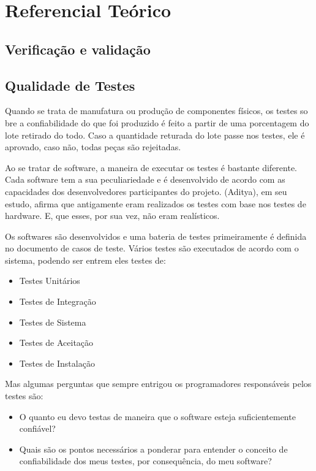 \chapter[Referencial]{Referencial Teórico}

\section{Verificação e validação}
\section{Qualidade de Testes}
Quando se trata de manufatura ou produção de componentes físicos, os testes so
bre a confiabilidade do que foi produzido é feito a partir de uma porcentagem
do lote retirado do todo. Caso a quantidade returada do lote passe nos testes,
ele é aprovado, caso não, todas peças são rejeitadas.

Ao se tratar de software, a maneira de executar os testes é bastante diferente.
Cada software tem a sua peculiariedade e é desenvolvido de acordo com as
capacidades dos desenvolvedores participantes do projeto. (Aditya), em seu estudo,
afirma que antigamente eram realizados os testes com base nos testes de hardware.
E, que esses, por sua vez, não eram realísticos.

Os softwares são desenvolvidos e uma bateria de testes primeiramente é definida no
documento de casos de teste. Vários testes são  executados de acordo com o sistema,
podendo ser entrem eles testes de:

\begin{itemize}
\item Testes Unitários
\item Testes de Integração
\item Testes de Sistema
\item Testes de Aceitação
\item Testes de Instalação
\end{itemize}

Mas algumas perguntas que sempre entrigou os programadores responsáveis pelos testes são:

\begin{itemize}
\item O quanto eu devo testas de maneira que o software esteja suficientemente
confiável?
\item Quais são os pontos necessários a ponderar para entender o conceito
de confiabilidade dos meus testes, por consequência, do meu software?
\end{itemize}

